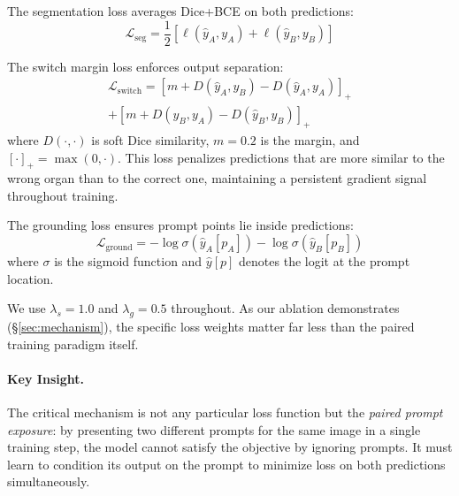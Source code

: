 The segmentation loss averages Dice+BCE on both predictions:
\begin{equation}
\mathcal{L}_{\text{seg}} = \frac{1}{2}\left[\ell(\hat{y}_A, y_A) + \ell(\hat{y}_B, y_B)\right]
\end{equation}

The switch margin loss enforces output separation:
\begin{multline}
\mathcal{L}_{\text{switch}} = \left[m + D(\hat{y}_A, y_B) - D(\hat{y}_A, y_A)\right]_+ \\
+ \left[m + D(\hat{y}_B, y_A) - D(\hat{y}_B, y_B)\right]_+
\label{eq:switch_loss}
\end{multline}
where $D(\cdot,\cdot)$ is soft Dice similarity, $m{=}0.2$ is the margin, and $[\cdot]_+ = \max(0, \cdot)$. This loss penalizes predictions that are more similar to the wrong organ than to the correct one, maintaining a persistent gradient signal throughout training.

The grounding loss ensures prompt points lie inside predictions:
\begin{equation}
\mathcal{L}_{\text{ground}} = -\log\sigma(\hat{y}_A[p_A]) - \log\sigma(\hat{y}_B[p_B])
\end{equation}
where $\sigma$ is the sigmoid function and $\hat{y}[p]$ denotes the logit at the prompt location.

We use $\lambda_s{=}1.0$ and $\lambda_g{=}0.5$ throughout. As our ablation demonstrates (\S\ref{sec:mechanism}), the specific loss weights matter far less than the paired training paradigm itself.

\paragraph{Key Insight.}
The critical mechanism is not any particular loss function but the \emph{paired prompt exposure}: by presenting two different prompts for the same image in a single training step, the model cannot satisfy the objective by ignoring prompts. It must learn to condition its output on the prompt to minimize loss on both predictions simultaneously.
